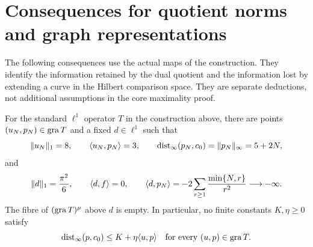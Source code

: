 \section{Consequences for quotient norms and graph representations}
The following consequences use the actual maps of the construction. They
identify the information retained by the dual quotient and the information
lost by extending a curve in the Hilbert comparison space. They are separate deductions,
not additional assumptions in the core maximality proof.

\begin{corollary}\label{cor:corona}
For the standard $\ell^1$ operator $T$ in the construction above, there are
points $(u_N,p_N)\in\operatorname{gra} T$ and a fixed $d\in\ell^1$ such that
\begin{equation}
\|u_N\|_1=8,\qquad \langle u_N,p_N\rangle=3,\qquad
\operatorname{dist}_{\infty}(p_N,c_0)=\|p_N\|_\infty=5+2N,
\label{eq:cor-constant-work}
\end{equation}
and
\begin{equation}
\|d\|_1=\frac{\pi^2}{6},\qquad \langle d,f\rangle=0,\qquad
\langle d,p_N\rangle=-2\sum_{r\ge1}\frac{\min\{N,r\}}{r^2}\longrightarrow-\infty.
\label{eq:cor-fixed-detector}
\end{equation}
The fibre of $(\operatorname{gra} T)^\mu$ above $d$ is empty. In particular, no finite
constants $K,\eta\ge0$ satisfy
\begin{equation}
\operatorname{dist}_{\infty}(p,c_0)\le K+\eta\langle u,p\rangle
\quad\text{for every }(u,p)\in\operatorname{gra} T.
\label{eq:cor-WCC-failure}
\end{equation}
\end{corollary}
